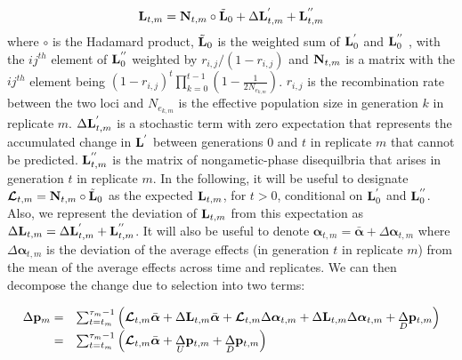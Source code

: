 \documentclass[12pt]{article}
\begin{document}
\begin{bibunit}
\begin{equation}
{\bf L}_{t,m}= {\bf N}_{t,m}\circ\tilde{\bf L}_{0}+\Delta {\bf L}^{'}_{t,m}+{\bf L}^{''}_{t,m}
\label{Eq:LD_dynamics}
\end{equation}
where $\circ$ is the Hadamard product, $\tilde{\bf L}_{0}$ is the weighted sum of ${\bf L}^{'}_{0}$ and ${\bf L}^{''}_{0}$ , with the $ij^{th}$ element of ${\bf L}^{''}_{0}$ weighted by $r_{i,j}/(1-r_{i,j})$ and ${\bf N}_{t,m}$ is a matrix with the $ij^{th}$ element being $(1-r_{i,j})^{t}\prod_{k=0}^{t-1}(1-\frac{1}{2N_{e_{k,m}}})$. $r_{i,j}$ is the recombination rate between the two loci and  $N_{e_{k,m}}$ is the effective population size in generation $k$ in replicate $m$. $\Delta {\bf L}^{'}_{t,m}$ is a stochastic term with zero expectation that represents the accumulated change in ${\bf L}^{'}$ between generations 0 and $t$ in replicate $m$ that cannot be predicted. ${\bf L}^{''}_{t,m}$ is the matrix of nongametic-phase disequilbria that arises in generation $t$ in replicate $m$.  In the following, it will be useful to designate $\boldsymbol{\mathcal{L}}_{t,m} = {\bf N}_{t,m}\circ\tilde{\bf L}_0$ as the expected ${\bf L}_{t,m}$, for $t>0$, conditional on ${\bf L}^{'}_{0}$ and ${\bf L}^{''}_{0}$. Also, we represent the deviation of ${\bf L}_{t,m}$ from this expectation as $\Delta {\bf L}_{t,m}=\Delta {\bf L}^{'}_{t,m}+{\bf L}^{''}_{t,m}$. It will also be useful to denote $\boldsymbol{\alpha}_{t,m}=\bar{\boldsymbol{\alpha}}+\Delta\boldsymbol{\alpha}_{t,m}$ where $\Delta\boldsymbol{\alpha}_{t,m}$ is the deviation of the average effects (in generation $t$ in replicate $m$) from the mean of the average effects across time and replicates.  We can then decompose the change due to selection into two terms:

\begin{equation}
\begin{array}{rl}
\Delta {\bf p}_m
=& \sum_{t=t_m}^{\tau_m-1} \left(\boldsymbol{\mathcal{L}}_{t,m}\bar{\boldsymbol{\alpha}}+\Delta{\bf L}_{t,m}\bar{\boldsymbol{\alpha}}+\boldsymbol{\mathcal{L}}_{t,m}\Delta\boldsymbol{\alpha}_{t,m}+\Delta{\bf L}_{t,m}\Delta\boldsymbol{\alpha}_{t,m}+\underset{D}\Delta {\bf p}_{t, m}\right)\\
=& \sum_{t=t_m}^{\tau_m-1} \left(\boldsymbol{\mathcal{L}}_{t,m}\bar{\boldsymbol{\alpha}}+\underset{U}\Delta {\bf p}_{t, m}+\underset{D}\Delta {\bf p}_{t, m}\right)\\
\end{array}
\label{Eq:dp}
\end{equation}


\end{bibunit}
\end{document}
